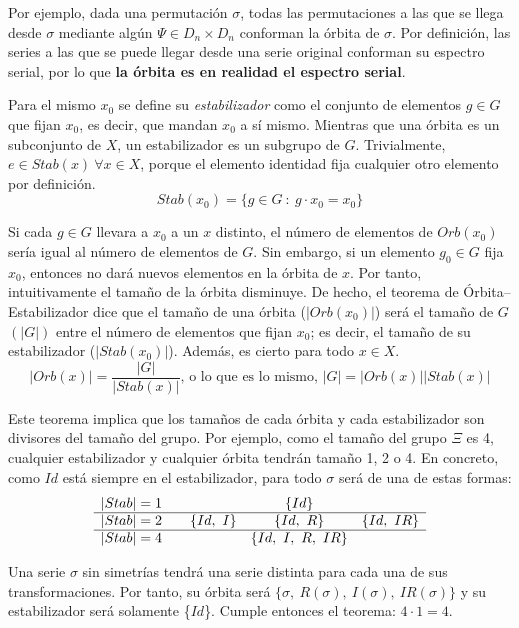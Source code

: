 		Por ejemplo, dada una permutaci\'on $\sigma$, todas las permutaciones a las que se llega desde $\sigma$ mediante alg\'un $\Psi\in{D}_{n}\times{D}_{n}$
		conforman la \'orbita de $\sigma$. Por definici\'on, las series a las que se puede llegar desde una serie original conforman su espectro serial, por lo que \textbf{la \'orbita es en realidad el espectro serial}.
	
		Para el mismo $x_0$ se define su \emph{estabilizador} como el conjunto de elementos $g\in G$ que fijan $x_0$, es decir, que mandan $x_0$ a s\'i mismo. Mientras que una \'orbita es un subconjunto de $X$, un estabilizador es un subgrupo de $G$. Trivialmente, $e\in Stab(x)\ \forall x\in X$, porque el elemento identidad fija cualquier otro elemento por definici\'on.
		\[Stab(x_0)=\{g\in {G}\ :\ g\cdot x_0 =x_0 \}\]
	
		Si cada $g\in G$ llevara a $x_0$ a un $x$ distinto, el n\'umero de elementos de $Orb(x_0)$ ser\'ia igual al n\'umero de elementos de $G$. Sin embargo, si un elemento $g_0\in G$ fija $x_0$, entonces no dar\'a nuevos elementos en la \'orbita de $x$. Por tanto, intuitivamente el tama\~no de la \'orbita disminuye. De hecho,  el teorema de \'Orbita--Estabilizador dice que el tama\~no de una \'orbita ($|Orb(x_0)|$) ser\'a el tama\~no de $G$ $(|G|)$ entre el n\'umero de elementos que fijan $x_0$; es decir, el tama\~no de su estabilizador ($|Stab(x_0)|$). Adem\'as, es cierto para todo $x\in X$.
		\[|Orb(x)|=\frac{|{G}|}{|Stab(x)|}\mbox{, o lo que es lo mismo, }|{G}|=|Orb(x)||Stab(x)|\]
		
		\def\arraystretch{1.5}
		Este teorema implica que los tama\~nos de cada \'orbita y cada estabilizador son divisores del tama\~no del grupo. Por ejemplo, como el tama\~no del grupo $\Xi$ es 4, cualquier estabilizador y cualquier \'orbita tendr\'an tama\~no 1, 2 o 4. En concreto, como $Id$ est\'a siempre en el estabilizador, para  todo $\sigma$ ser\'a de una de estas formas:
		\[\begin{array}{*{5}c}
		|Stab|=1&&&\{{Id}\}&\\
		\hline|Stab|=2&&\{Id,\ I\}&\{Id,\ R\}&\{Id,\ IR\}\\
		\hline|Stab|=4&&&\{Id,\ I,\ R,\ IR\}&\\
		\end{array}\]
		
		\def\arraystretch{1}
		Una serie $\sigma$ sin simetr\'ias tendr\'a una serie distinta para cada una de sus transformaciones. Por tanto, su \'orbita ser\'a $\{\sigma,\ R(\sigma),\ I(\sigma),\ IR(\sigma)\}$ y su estabilizador ser\'a solamente \{$Id$\}. Cumple entonces el teorema: $4\cdot 1 = 4$.
	

